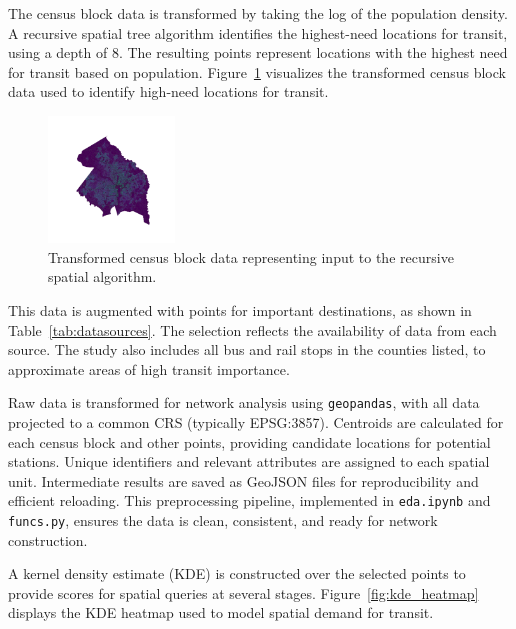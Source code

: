 \documentclass[sigconf,nonacm]{acmart}
\begin{document}
The census block data is transformed by taking the log of the population density. A recursive spatial tree algorithm identifies the highest-need locations for transit, using a depth of 8. The resulting points represent locations with the highest need for transit based on population. Figure~\ref{fig:point_likelihood} visualizes the transformed census block data used to identify high-need locations for transit.

\begin{figure}[ht]
    \centering
    \includegraphics[width=0.3\textwidth]{./img/point_likelihood.png}
    \caption{Transformed census block data representing input to the recursive spatial algorithm.}
    \label{fig:point_likelihood}
\end{figure}

This data is augmented with points for important destinations, as shown in Table~\ref{tab:datasources}. The selection reflects the availability of data from each source. The study also includes all bus and rail stops in the counties listed, to approximate areas of high transit importance.

Raw data is transformed for network analysis using \texttt{geopandas}, with all data projected to a common CRS (typically EPSG:3857). Centroids are calculated for each census block and other points, providing candidate locations for potential stations. Unique identifiers and relevant attributes are assigned to each spatial unit. Intermediate results are saved as GeoJSON files for reproducibility and efficient reloading. This preprocessing pipeline, implemented in \texttt{eda.ipynb} and \texttt{funcs.py}, ensures the data is clean, consistent, and ready for network construction.

A kernel density estimate (KDE) is constructed over the selected points to provide scores for spatial queries at several stages. Figure~\ref{fig:kde_heatmap} displays the KDE heatmap used to model spatial demand for transit.
\end{document}
